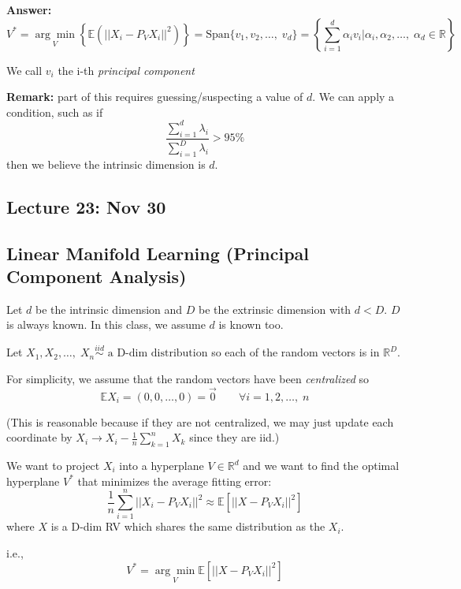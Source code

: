 \documentclass[12pt]{article}
\newcommand{\R}{\mathbb{R}}
\newcommand{\E}{\mathbb{E}}
\newcommand{\abs}[1]{\left\vert #1 \right\vert}
\newcommand{\iid}{\overset{iid}{\sim}}
\begin{document}
        \textbf{Answer:} 
        \[V^* = \underset{V}{\arg\min} \left\{\E(\abs{\abs{X_i - P_VX_i}}^2)\right\} = \text{Span}\{v_1, v_2, \dots, \; v_d \} = \left\{\sum_{i=1}^d \alpha_i v_i \bigg\vert \alpha_i, \alpha_2, \dots, \; \alpha_d \in \R\right\}\]

        We call $v_i$ the i-th \emph{principal component}

        \textbf{Remark:} part of this requires guessing/suspecting a value of $d$. We can apply a condition, such as if
        \[\frac{\sum_{i=1}^d \lambda_i}{\sum_{i=1}^D \lambda_i} > 95\%\]
        then we believe the intrinsic dimension is $d$.

\subsection{Lecture 23: Nov 30}
    \subsection{Linear Manifold Learning (Principal Component Analysis)} 
        Let $d$ be the intrinsic dimension and $D$ be the extrinsic dimension with $d < D$. $D$ is always known. In this class, we assume $d$ is known too. 

        Let $X_1, X_2, \dots, \; X_n \iid \text{ a D-dim distribution}$ so each of the random vectors is in $\R^D$. 

        For simplicity, we assume that the random vectors have been \emph{centralized} so 
        \[\E X_i = (0, 0, \dots, 0) = \vec 0 \qquad \forall i = 1, 2, \dots,\; n\]

        (This is reasonable because if they are not centralized, we may just update each coordinate by $X_i \rightarrow X_i - \frac{1}{n}\sum_{k=1}^n X_k$ since they are iid.)

        We want to project $X_i$ into a hyperplane $V \in \R^d$ and we want to find the optimal hyperplane $V^*$ that minimizes the average fitting error:
        \[\frac{1}{n}\sum_{i=1}^n \abs{\abs{X_i - P_VX_i}}^2 \approx \E[\abs{\abs{X - P_VX_i}}^2]\]
        where $X$ is a D-dim RV which shares the same distribution as the $X_i$.

        i.e., 
        \[V^* = \underset{V}{\arg\min} \E[\abs{\abs{X - P_VX_i}}^2]\]
\end{document}
